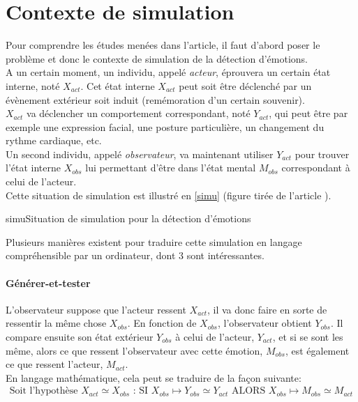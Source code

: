 \documentclass[overfullbox, poster]{polytech/polytech}
\begin{document}
\section{Contexte de simulation}
Pour comprendre les études menées dans l'article, il faut d'abord poser le problème et donc le contexte de simulation de la détection d'émotions.\\
A un certain moment, un individu, appelé \textit{acteur}, éprouvera un certain état interne, noté $X_{act}$. Cet état interne $X_{act}$ peut soit être déclenché par un évènement extérieur soit induit (remémoration d'un certain souvenir).\\
$X_{act}$ va déclencher un comportement correspondant, noté $Y_{act}$, qui peut être par exemple une expression facial, une posture particulière, un changement du rythme cardiaque, etc.\\
Un second individu, appelé \textit{observateur}, va maintenant utiliser $Y_{act}$ pour trouver l'état interne $X_{obs}$ lui permettant d'être dans l'état mental $M_{obs}$ correspondant à celui de l'acteur.\\
Cette situation de simulation est illustré en \autoref{simu} (figure tirée de l'article \cite{italiens}).

\begin{Figure}{simu}{Situation de simulation pour la détection d'émotions}
\end{Figure}

Plusieurs manières existent pour traduire cette simulation en langage compréhensible par un ordinateur, dont 3 sont intéressantes.

\paragraph{Générer-et-tester}
L'observateur suppose que l'acteur ressent $X_{act}$, il va donc faire en sorte de ressentir la même chose $X_{obs}$. En fonction de $X_{obs}$, l'observateur obtient $Y_{obs}$. Il compare ensuite son état extérieur $Y_{obs}$ à celui de l'acteur, $Y_{act}$, et si se sont les même, alors ce que ressent l'observateur avec cette émotion, $M_{obs}$, est également ce que ressent l'acteur, $M_{act}$.\\
En langage mathématique, cela peut se traduire de la façon suivante:
\begin{align*}
\text{Soit l'hypothèse }X_{act}\simeq X_{obs}\text{ : SI } X_{obs}\mapsto Y_{obs}\simeq Y_{act} \text{ ALORS } X_{obs}\mapsto M_{obs}\simeq M_{act}
\end{align*}
\end{document}
